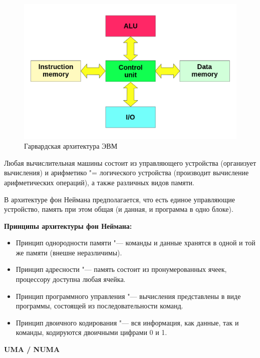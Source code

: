 \documentclass[bachelor, och, pract]{SCWorks}
\theoremstyle{remark}
\begin{document}
    \begin{figure}[H]
        \begin{center}
            \includegraphics[scale=0.3]{res/Harvard_architecture.png}
            \caption{Гарвардская архитектура ЭВМ}
        \end{center}
    \end{figure}

    Любая вычислительная машины состоит из управляющего устройства (организует вычисления) и арифметико "= логического устройства (производит вычисление арифметических операций), а также различных видов памяти.
    
    В архитектуре фон Неймана предполагается, что есть единое управляющие устройство, память при этом общая (и данная, и программа в одно блоке).

    \textbf{Принципы архитектуры фон Неймана:} 

    \begin{itemize}[label=$\bullet$]
        \item Принцип однородности памяти "--- команды и данные хранятся в одной и той же памяти (внешне неразличимы).
        \item Принцип адресности "--- память состоит из пронумерованных ячеек, процессору доступна любая ячейка.
        \item Принцип программного управления "--- вычисления представлены в виде программы, состоящей из последовательности команд.
        \item Принцип двоичного кодирования "--- вся информация, как данные, так и команды, кодируются двоичными цифрами 0 и 1.
    \end{itemize}

    \hfill \break
    \begin{center}
        \textbf{UMA / NUMA}        
    \end{center}
\end{document}
